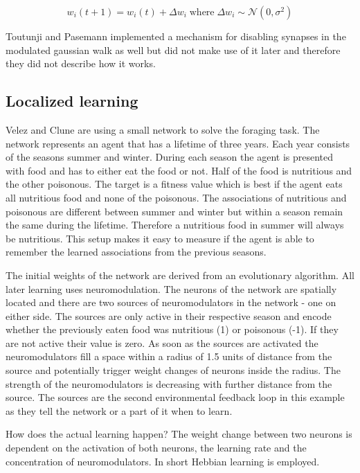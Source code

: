 \documentclass[12pt,twoside]{scrartcl}
\theoremstyle{plain}
\theoremstyle{definition}
\theoremstyle{remark}
\begin{document}
\[
    w_i (t + 1) = w_i (t) + \Delta w_i \;\text{where}\; \Delta w_i \sim \mathcal{N}(0, \sigma^2)
\]

Toutunji and Pasemann implemented a mechanism for disabling synapses
in the modulated gaussian walk as well but did not make use of it later and
therefore they did not describe how it works.

\subsection{Localized learning}
\label{subsec:diffusion}

Velez and Clune are using a small network to solve the foraging task. The network
represents an agent that has a lifetime of three years. Each year consists of
the seasons summer and winter. During each season the agent is presented with
food and has to either eat the food or not. Half of the food is nutritious
and the other poisonous. The target is a fitness value which is best if the
agent eats all nutritious food and none of the poisonous. The associations of
nutritious and poisonous are different between summer and winter but within
a season remain the same during the lifetime. Therefore a nutritious food in
summer will always be nutritious.
This setup makes it easy to measure if the agent is able to remember the learned
associations from the previous seasons.

The initial weights of the network are derived from an evolutionary algorithm.
All later learning uses neuromodulation. The neurons of the network are spatially
located and there are two sources of neuromodulators in the network - one on either
side. The sources are only active in their respective season and encode whether
the previously eaten food was nutritious (1) or poisonous (-1). If they are
not active their value is zero. As soon as the sources are activated the neuromodulators
fill a space within a radius of 1.5 units of distance from the source and potentially
trigger weight changes of neurons inside the radius. The strength of the neuromodulators
is decreasing with further distance from the source. The sources are the second
environmental feedback loop in this example as they tell the network or a part of
it when to learn.

How does the actual learning happen? The weight change between two neurons
is dependent on the activation of both neurons, the learning rate and the concentration
of neuromodulators. In short Hebbian learning is employed. 
\end{document}
